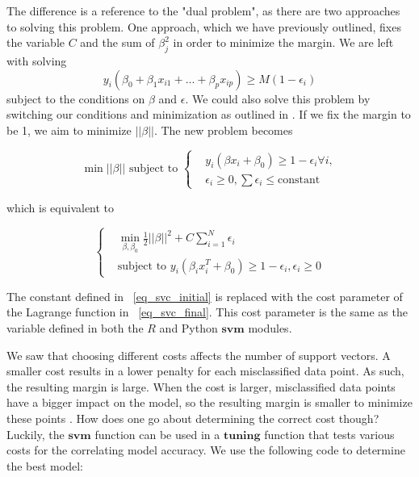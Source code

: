 \documentclass[12pt]{article}
\begin{document}
The difference is a reference to the "dual problem", as there are two approaches to solving this problem. One approach, which we have previously outlined, fixes the variable \(C\) and the sum of \(\beta_j^2\) in order to minimize the margin. We are left with solving \[
    y_i(\beta_0+\beta_1x_{i1}+...+\beta_px_{ip}) \ge M(1-\epsilon_i)
    \]
subject to the conditions on \(\beta\) and \(\epsilon\). We could also solve this problem by switching our conditions and minimization as outlined in \cite{esl2}. If we fix the margin to be 1, we aim to minimize \(||\beta||\). The new problem becomes 

\begin{equation} 
    \min ||\beta|| \text{ subject to }
    \begin{cases}
        &y_i(\beta x_i + \beta_0) \ge 1 - \epsilon_i \forall i, \\ & \epsilon_i \ge 0, \sum \epsilon_i \le \text{constant} 
    \end{cases}
    \label{eq_svc_initial}
\end{equation}

which is equivalent to

\begin{equation}
    \begin{cases}
        & \min_{\beta,\beta_0} \frac{1}{2} ||\beta||^2 + C \sum_{i=1}^{N} \epsilon_i \\
        & \text{subject to } y_i(\beta_i x_i^T+\beta_0) \ge 1 - \epsilon_i, \epsilon_i \ge 0
    \end{cases}
    \label{eq_svc_final}
\end{equation}

The constant defined in ~\ref{eq_svc_initial} is replaced with the cost parameter of the Lagrange function in ~\ref{eq_svc_final}. This cost parameter is the same as the variable defined in both the $R$ and Python $\textbf{svm}$ modules.

We saw that choosing different costs affects the number of support vectors. A smaller cost results in a lower penalty for each misclassified data point. As such, the resulting margin is large. When the cost is larger, misclassified data points have a bigger impact on the model, so the resulting margin is smaller to minimize these points \citep{cost_parameter}. How does one go about determining the correct cost though? Luckily, the $\textbf{svm}$ function can be used in a $\textbf{tuning}$ function that tests various costs for the correlating model accuracy. We use the following code to determine the best model:
\end{document}
